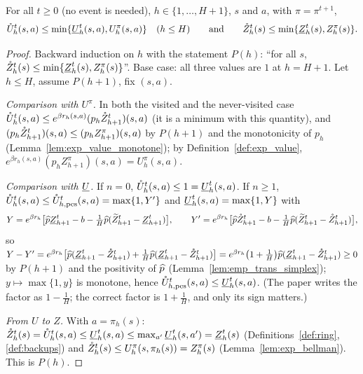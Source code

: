 \begin{lemma}\label{lem:ring_pos}
\leanok
{}
For all $t \ge 0$ (no event is needed), $h \in \{1, \dots, H + 1\}$, $s$ and $a$, with $\pi = \pi^{t+1}$,
\[
  \mathring{U}_h^t(s,a) \le \min\{\underline{U}_h^t(s,a), U^\pi_h(s,a)\} \quad (h \le H)
  \qquad\text{and}\qquad
  \mathring{Z}_h^t(s) \le \min\{\underline{Z}_h^t(s), Z^\pi_h(s)\} .
\]
\end{lemma}

\begin{proof}
\leanok
Backward induction on $h$ with the statement $P(h)$: ``for all $s$,
$\mathring{Z}_h^t(s) \le \min\{\underline{Z}_h^t(s), Z^\pi_h(s)\}$''. Base case: all three values are $1$ at $h = H + 1$.
Let $h \le H$, assume $P(h+1)$, fix $(s,a)$.

\emph{Comparison with $U^\pi$.} In both the visited and the never-visited case
$\mathring{U}_h^t(s,a) \le e^{\beta r_h(s,a)}(p_h\mathring{Z}^t_{h+1})(s,a)$ (it is a minimum with this quantity), and
$(p_h\mathring{Z}^t_{h+1})(s,a) \le (p_h Z^\pi_{h+1})(s,a)$ by $P(h+1)$ and the monotonicity of $p_h$
(Lemma~\ref{lem:exp_value_monotone}); by Definition~\ref{def:exp_value},
$e^{\beta r_h(s,a)}(p_h Z^\pi_{h+1})(s,a) = U^\pi_h(s,a)$.

\emph{Comparison with $\underline{U}$.} If $n = 0$, $\mathring{U}_h^t(s,a) \le 1 = \underline{U}_h^t(s,a)$. If $n \ge 1$,
$\mathring{U}_h^t(s,a) \le \mathring{U}^t_{h,\mathrm{pes}}(s,a) = \max\{1, Y'\}$ and $\underline{U}_h^t(s,a) = \max\{1, Y\}$ with
\[
  Y = e^{\beta r_h}\big[\widehat{p}\underline{Z}^t_{h+1} - b - \tfrac1H\widehat{p}(\widetilde{Z}^t_{h+1} - \underline{Z}^t_{h+1})\big], \qquad
  Y' = e^{\beta r_h}\big[\widehat{p}\mathring{Z}^t_{h+1} - b - \tfrac1H\widehat{p}(\widetilde{Z}^t_{h+1} - \mathring{Z}^t_{h+1})\big],
\]
so $Y - Y' = e^{\beta r_h}\big[\widehat{p}(\underline{Z}^t_{h+1} - \mathring{Z}^t_{h+1}) + \tfrac1H\widehat{p}(\underline{Z}^t_{h+1} - \mathring{Z}^t_{h+1})\big]
= e^{\beta r_h}\big(1 + \tfrac1H\big)\widehat{p}(\underline{Z}^t_{h+1} - \mathring{Z}^t_{h+1}) \ge 0$ by $P(h+1)$ and the
positivity of $\widehat{p}$ (Lemma~\ref{lem:emp_trans_simplex}); $y \mapsto \max\{1, y\}$ is monotone,
hence $\mathring{U}^t_{h,\mathrm{pes}}(s,a) \le \underline{U}_h^t(s,a)$. (The paper writes the factor as $1 - \frac1H$; the
correct factor is $1 + \frac1H$, and only its sign matters.)

\emph{From $U$ to $Z$.} With $a = \pi_h(s)$: $\mathring{Z}_h^t(s) = \mathring{U}_h^t(s, a) \le \underline{U}_h^t(s, a) \le \max_{a'}\underline{U}_h^t(s,a') = \underline{Z}_h^t(s)$
(Definitions~\ref{def:ring}, \ref{def:backups}) and
$\mathring{Z}_h^t(s) \le U^\pi_h(s, \pi_h(s)) = Z^\pi_h(s)$ (Lemma~\ref{lem:exp_bellman}). This is $P(h)$.
\end{proof}

